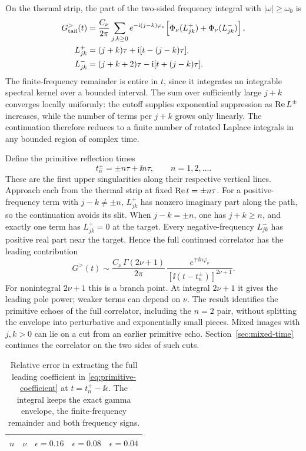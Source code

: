 On the thermal strip, the part of the two-sided frequency integral
with \(|\omega|\geq\omega_0\) is
\begin{align}
 G^>_{\rm tail}(t)
 &=\frac{C_\nu}{2\pi}\sum_{j,k\geq0}
 e^{-\mathrm{i}(j-k)\varphi_\nu}\!
 \left[\Phi_\nu(L^+_{jk})+\Phi_\nu(L^-_{jk})\right],\notag\\
 L^+_{jk}&=(j+k)\tau+\mathrm{i}[t-(j-k)\tau],\notag\\
 L^-_{jk}&=(j+k+2)\tau-\mathrm{i}[t+(j-k)\tau].
 \label{eq:laplace-image}
\end{align}
The finite-frequency remainder is entire in \(t\), since it
integrates an integrable spectral kernel over a bounded interval.
The sum over sufficiently large \(j+k\) converges locally uniformly:
the cutoff supplies exponential suppression as \({\rm Re}\,L^\pm\)
increases, while the number of terms per \(j+k\) grows only linearly.
The continuation therefore reduces to a finite number of rotated
Laplace integrals in any bounded region of complex time.

Define the primitive reflection times
\begin{equation}
 t_n^\pm=\pm n\tau+\ii n\tau,\qquad n=1,2,\ldots .
\end{equation}
These are the first upper singularities along their respective
vertical lines. Approach each from the thermal strip at fixed
\({\rm Re}\,t=\pm n\tau\). For a positive-frequency term with
\(j-k\ne\pm n\), \(L^+_{jk}\) has nonzero imaginary part along
the path, so the continuation avoids its slit. When \(j-k=\pm n\),
one has \(j+k\geq n\), and exactly one term has \(L^+_{jk}=0\) at
the target. Every negative-frequency \(L^-_{jk}\) has positive
real part near the target. Hence the full continued correlator
has the leading contribution
\begin{equation}
 G^>(t)\sim
 \frac{C_\nu\,\Gamma(2\nu+1)}{2\pi}\,
 \frac{e^{\mp\ii n\varphi_\nu}}
      {[\ii(t-t_n^\pm)]^{2\nu+1}} .
 \label{eq:primitive-coefficient}
\end{equation}
For nonintegral \(2\nu+1\) this is a branch point. At integral
\(2\nu+1\) it gives the leading pole power; weaker terms can
depend on \(\nu\). The result identifies the primitive echoes of
the full correlator, including the \(n=2\) pair, without splitting
the envelope into perturbative and exponentially small pieces.
Mixed images with \(j,k>0\) can lie on a cut from an earlier
primitive echo. Section~\ref{sec:mixed-time} continues the correlator
on the two sides of such cuts.

\begin{table}[t]
 \centering\small
 \begin{tabular}{ccccc}
 \hline
 \(n\) & \(\nu\) & \(\epsilon=0.16\) & \(\epsilon=0.08\) &
 \(\epsilon=0.04\) \\
 \hline
 
 \end{tabular}
 \caption{Relative error in extracting the full leading coefficient
 in \eqref{eq:primitive-coefficient} at \(t=t_n^+-\ii\epsilon\).
 The integral keeps the exact gamma envelope, the finite-frequency
 remainder and both frequency signs.}
 \label{tab:time-check}
\end{table}

